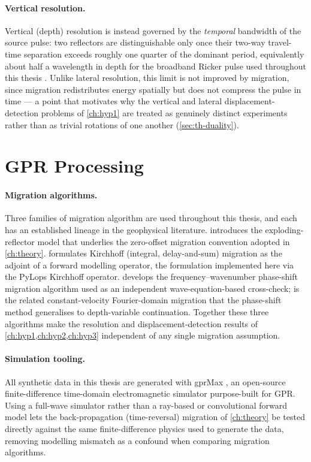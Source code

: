 \paragraph{Vertical resolution.} Vertical (depth) resolution is instead
governed by the \emph{temporal} bandwidth of the source pulse: two
reflectors are distinguishable only once their two-way travel-time
separation exceeds roughly one quarter of the dominant period, equivalently
about half a wavelength in depth for the broadband Ricker pulse used
throughout this thesis \citep{daniels2004}. Unlike lateral resolution, this
limit is not improved by migration, since migration redistributes energy
spatially but does not compress the pulse in time --- a point that motivates
why the vertical and lateral displacement-detection problems of
\cref{ch:hyp1} are treated as genuinely distinct experiments rather than as
trivial rotations of one another (\cref{sec:th-duality}).

\section{GPR Processing}

\paragraph{Migration algorithms.} Three families of migration algorithm are
used throughout this thesis, and each has an established lineage in the
geophysical literature. \citet{claerbout1985} introduces the
exploding-reflector model that underlies the zero-offset migration
convention adopted in \cref{ch:theory}. \citet{schneider1978} formulates
Kirchhoff (integral, delay-and-sum) migration as the adjoint of a forward
modelling operator, the formulation implemented here via the PyLops
Kirchhoff operator. \citet{gazdag1978} develops the
frequency--wavenumber phase-shift migration algorithm used as an
independent wave-equation-based cross-check; \citet{stolt1978} is the
related constant-velocity Fourier-domain migration that the phase-shift
method generalises to depth-variable continuation. Together these three
algorithms make the resolution and displacement-detection results of
\cref{ch:hyp1,ch:hyp2,ch:hyp3} independent of any single migration
assumption.

\paragraph{Simulation tooling.} All synthetic data in this thesis are
generated with gprMax \citep{gprmax}, an open-source finite-difference
time-domain electromagnetic simulator purpose-built for GPR. Using a
full-wave simulator rather than a ray-based or convolutional forward model
lets the back-propagation (time-reversal) migration of \cref{ch:theory} be
tested directly against the same finite-difference physics used to generate
the data, removing modelling mismatch as a confound when comparing migration
algorithms.

